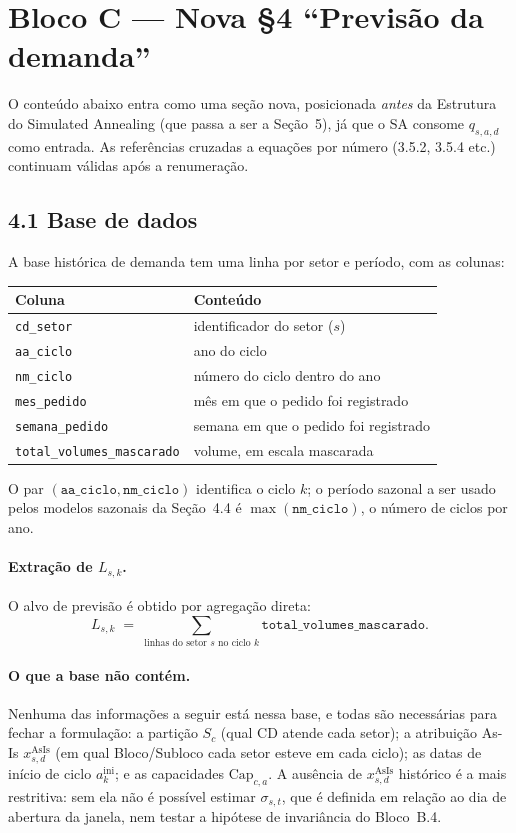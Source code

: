 \documentclass[11pt]{article}
\begin{document}
\section*{Bloco C — Nova §4 ``Previsão da demanda''}

O conteúdo abaixo entra como uma seção nova, posicionada \emph{antes} da
Estrutura do Simulated Annealing (que passa a ser a Seção~5), já que o SA
consome $q_{s,a,d}$ como entrada. As referências cruzadas a equações por
número (3.5.2, 3.5.4 etc.) continuam válidas após a renumeração.

\subsection*{4.1 Base de dados}

A base histórica de demanda tem uma linha por setor e período, com as
colunas:

\begin{center}
\begin{tabular}{@{}ll@{}}
\toprule
Coluna & Conteúdo \\
\midrule
\texttt{cd\_setor} & identificador do setor ($s$) \\
\texttt{aa\_ciclo} & ano do ciclo \\
\texttt{nm\_ciclo} & número do ciclo dentro do ano \\
\texttt{mes\_pedido} & mês em que o pedido foi registrado \\
\texttt{semana\_pedido} & semana em que o pedido foi registrado \\
\texttt{total\_volumes\_mascarado} & volume, em escala mascarada \\
\bottomrule
\end{tabular}
\end{center}

\noindent O par $(\texttt{aa\_ciclo}, \texttt{nm\_ciclo})$ identifica o
ciclo $k$; o período sazonal a ser usado pelos modelos sazonais da
Seção~4.4 é $\max(\texttt{nm\_ciclo})$, o número de ciclos por ano.

\paragraph{Extração de $L_{s,k}$.} O alvo de previsão é obtido por
agregação direta:
\[
L_{s,k} \;=\; \sum_{\text{linhas do setor } s \text{ no ciclo } k}
\texttt{total\_volumes\_mascarado}.
\]

\paragraph{O que a base não contém.} Nenhuma das informações a seguir
está nessa base, e todas são necessárias para fechar a formulação:
a partição $S_c$ (qual CD atende cada setor); a atribuição As-Is
$x^{\mathrm{AsIs}}_{s,d}$ (em qual Bloco/Subloco cada setor esteve em cada
ciclo); as datas de início de ciclo $a^{\mathrm{ini}}_k$; e as capacidades
$\mathrm{Cap}_{c,a}$. A ausência de $x^{\mathrm{AsIs}}_{s,d}$ histórico é a
mais restritiva: sem ela não é possível estimar $\sigma_{s,t}$, que é
definida em relação ao dia de abertura da janela, nem testar a hipótese de
invariância do Bloco~B.4.
\end{document}
